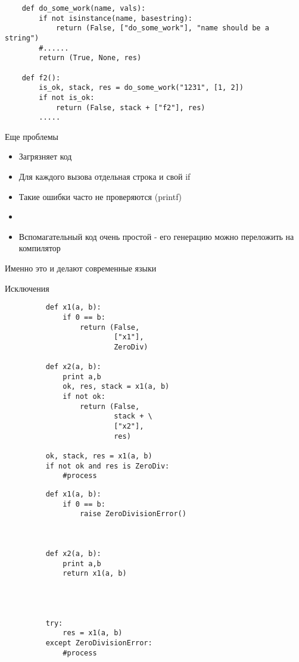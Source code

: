 \documentclass{article}
\begin{document}
\begin{lstlisting}
	def do_some_work(name, vals):
		if not isinstance(name, basestring):
			return (False, ["do_some_work"], "name should be a string")
		#......
		return (True, None, res)

	def f2():
		is_ok, stack, res = do_some_work("1231", [1, 2])
		if not is_ok:
			return (False, stack + ["f2"], res)
		.....
\end{lstlisting}
\newpage

\begin{center} Еще проблемы \end{center}
\begin{itemize}
	\item Загрязняет код
	\item Для каждого вызова отдельная строка и свой if
	\item Такие ошибки часто не проверяются (printf)
	\item
	\item Вспомагательный код очень простой - его 
		  генерацию можно переложить на компилятор
\end{itemize}
\newpage

\begin{center} Именно это и делают современные языки \end{center}
\begin{center} Исключения \end{center}
\begin{figure}[ht]
\begin{minipage}[b]{0.45\linewidth}
\Large
\begin{lstlisting}
	def x1(a, b):
		if 0 == b:
			return (False, 
				    ["x1"],
				    ZeroDiv)

	def x2(a, b):
		print a,b
		ok, res, stack = x1(a, b)
		if not ok:
			return (False, 
					stack + \
					["x2"],
					res)

	ok, stack, res = x1(a, b)
	if not ok and res is ZeroDiv:
		#process
\end{lstlisting}
\end{minipage}
\hspace{2cm}
\begin{minipage}[b]{0.45\linewidth}
\Large
\begin{lstlisting}
	def x1(a, b):
		if 0 == b:
			raise ZeroDivisionError()



	def x2(a, b):
		print a,b
		return x1(a, b)




	try:
		res = x1(a, b)
	except ZeroDivisionError:
		#process
\end{lstlisting}
\end{minipage}
\end{figure}
\newpage
\end{document}
